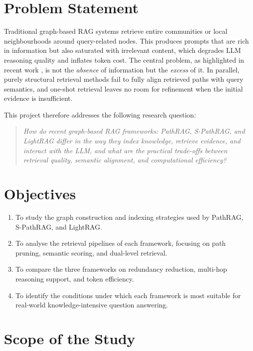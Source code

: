 \documentclass[12pt,a4paper,oneside]{report}
\begin{document}
\section{Problem Statement}
\label{sec:problem_statement}

Traditional graph-based RAG systems retrieve entire communities or local
neighbourhoods around query-related nodes. This produces prompts that are
rich in information but also saturated with irrelevant content, which
degrades LLM reasoning quality and inflates token cost. The central problem,
as highlighted in recent work \citep{chen2025pathrag, guo2025lightrag},
is not the \emph{absence} of information but the \emph{excess} of it. In parallel, purely structural
retrieval methods fail to fully align retrieved paths with query semantics,
and one-shot retrieval leaves no room for refinement when the initial
evidence is insufficient.

This project therefore addresses the following research question:
\begin{quote}
\itshape
How do recent graph-based RAG frameworks: PathRAG, S-PathRAG, and
LightRAG differ in the way they index knowledge, retrieve evidence, and
interact with the LLM, and what are the practical trade-offs between
retrieval quality, semantic alignment, and computational efficiency?
\end{quote}

\section{Objectives}

\begin{enumerate}[leftmargin=2em,itemsep=2pt]
    \item To study the graph construction and indexing strategies used by
          PathRAG, S-PathRAG, and LightRAG.
    \item To analyse the retrieval pipelines of each framework, focusing on
          path pruning, semantic scoring, and dual-level retrieval.
    \item To compare the three frameworks on redundancy reduction, multi-hop
          reasoning support, and token efficiency.
    \item To identify the conditions under which each framework is most
          suitable for real-world knowledge-intensive question answering.
\end{enumerate}

\section{Scope of the Study}
\end{document}
